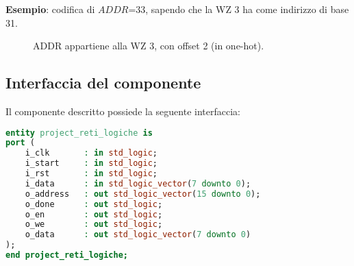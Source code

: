 \textbf{Esempio}: codifica di $ADDR$=33, sapendo che la WZ 3 ha come indirizzo di base 31.
\begin{figure}[!htb]
	\centering
	
	\caption{ADDR appartiene alla WZ 3, con offset 2 (in one-hot).}
	\label{fig:es_addr_in_wz}
\end{figure}



\subsection{Interfaccia del componente}
Il componente descritto possiede la seguente interfaccia:

\begin{lstlisting}[basicstyle=\small, language=VHDL]
entity project_reti_logiche is
port (
	i_clk 		: in std_logic;
	i_start 	: in std_logic;
	i_rst 		: in std_logic;
	i_data 		: in std_logic_vector(7 downto 0);
	o_address 	: out std_logic_vector(15 downto 0);
	o_done 		: out std_logic;
	o_en 		: out std_logic;
	o_we 		: out std_logic;
	o_data 		: out std_logic_vector(7 downto 0)
);
end project_reti_logiche;
\end{lstlisting}


